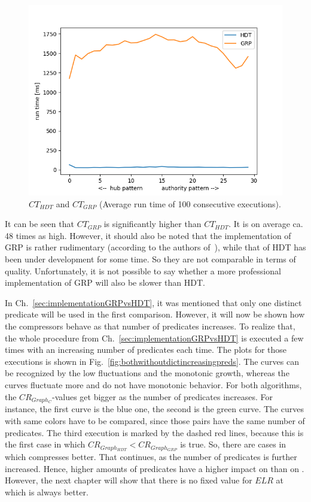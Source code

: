 \begin{figure}
	\centering
	\includegraphics[width=0.7\linewidth]{figures/GRPvsHDT/runtimes}
	\caption{$CT_{HDT}$ and $CT_{GRP}$ (Average run time of 100 consecutive executions).}
	\label{fig:runtimes}
\end{figure}


It can be seen that $CT_{GRP}$ is significantly higher than $CT_{HDT}$. It is on average ca. 48 times as high. However, it should also be noted that the implementation of GRP is rather rudimentary  (according to the authors of~\cite{maneth}), while that of HDT has been under development for some time. So they are not comparable in terms of quality. Unfortunately, it is not possible to say whether a more professional implementation of GRP will also be slower than HDT.

In Ch.~\ref{sec:implementationGRPvsHDT}, it was mentioned that only one distinct predicate will be used in the first comparison. However, it will now be shown how the compressors behave as that number of predicates increases. To realize that, the whole procedure from Ch.~\ref{sec:implementationGRPvsHDT} is executed a few times with an increasing number of predicates each time. The plots for those executions is shown in Fig.~\ref{fig:bothwithoutdictincreasingpreds}. The \GHDT{} curves can be recognized by the low fluctuations and the monotonic growth, whereas the \GGRP{} curves fluctuate more and do not have monotonic behavior. For both algorithms, the $CR_{Graph_C}$-values get bigger as the number of predicates increases. For  instance, the first \GGRP{} curve is the blue one, the second is the green curve. The curves with same colors have to be compared, since those pairs have the same number of predicates. The third execution is marked by the dashed red lines, because this is the first case in which $CR_{Graph_{HDT}} <CR_{Graph_{GRP}} $ is true. So, there are cases in which \GHDT{} compresses better. That continues, as the number of predicates is further increased. Hence, higher amounts of predicates have a higher impact on \GGRP{} than on \GHDT{}. However, the next chapter will show that there is no fixed value for $ELR$ at which \GHDT{} is always better.


